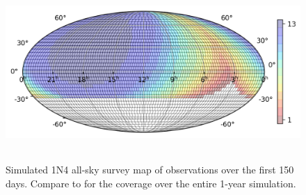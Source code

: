 \begin{colsection}
\begin{figure}[p]
    \begin{center}
        \includegraphics[height=190pt]{images/survey_sims/150_1N4_lite.png}
    \end{center}
    \caption[1N4 survey simulation observations over 150 days]{
        Simulated 1N4 all-sky survey map of observations over the first 150 days. Compare to  for the coverage over the entire 1-year simulation.
    }\label{fig:survey_sim_1n4_150}
\end{figure}

\clearpage
\newpage

\end{colsection}


